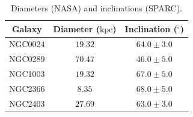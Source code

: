 \documentclass{article}
\newcommand\kpc{\textrm{kpc}}
\begin{document}
\singlespacing %
\begin{table}[h!]
    \centering
    \begin{tabular}{|c|c|c|}
        \hline
        Galaxy & Diameter ($\kpc$) & Inclination ($^\circ$) \\
        \hline
        NGC0024 & $19.32$ & $64.0 \pm 3.0$ \\
        NGC0289 & $70.47$ & $46.0 \pm 5.0$ \\
        NGC1003 & $19.32$ & $67.0 \pm 5.0$ \\
        NGC2366 & $8.35$ & $68.0 \pm 5.0$ \\
        NGC2403 & $27.69$ & $63.0 \pm 3.0$ \\ 
        \hline
    \end{tabular}
    \caption{Diameters (NASA) and inclinations (SPARC).}
    \label{tab:diameters-inclinations}
\end{table}
\doublespacing


\singlespacing
\end{document}
